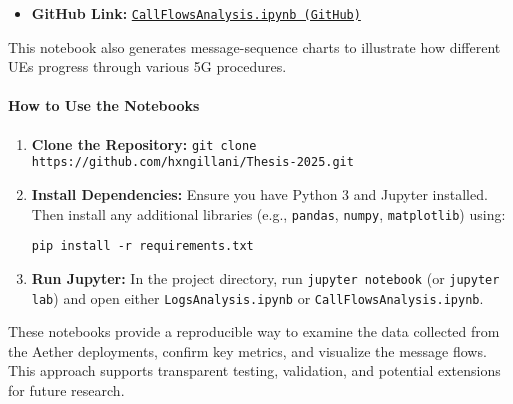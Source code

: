 \begin{itemize}
    \item \textbf{GitHub Link:}
    \href{https://github.com/hxngillani/Thesis-2025/blob/d0960d3a9d816eca167b428b2a6cfdfa707a49eb/Logs%26CallFlows%20Analysis/CallFlowsAnalysis.ipynb}{\texttt{CallFlowsAnalysis.ipynb (GitHub)}} 
\end{itemize}

\noindent
This notebook also generates message-sequence charts to illustrate how different UEs 
progress through various 5G procedures.

\paragraph{How to Use the Notebooks}
\begin{enumerate}
    \item \textbf{Clone the Repository:}
    \texttt{git clone https://github.com/hxngillani/Thesis-2025.git}
    \item \textbf{Install Dependencies:}
    Ensure you have Python 3 and Jupyter installed. Then install any additional
    libraries (e.g., \texttt{pandas}, \texttt{numpy}, \texttt{matplotlib}) using:
\begin{verbatim}
pip install -r requirements.txt
\end{verbatim}

    \item \textbf{Run Jupyter:}
    In the project directory, run \texttt{jupyter notebook} (or \texttt{jupyter lab})
    and open either \texttt{LogsAnalysis.ipynb} or \texttt{CallFlowsAnalysis.ipynb}.
\end{enumerate}

\noindent
These notebooks provide a reproducible way to examine the data collected from the
Aether deployments, confirm key metrics, and visualize the message flows. This approach
supports transparent testing, validation, and potential extensions for future research.
